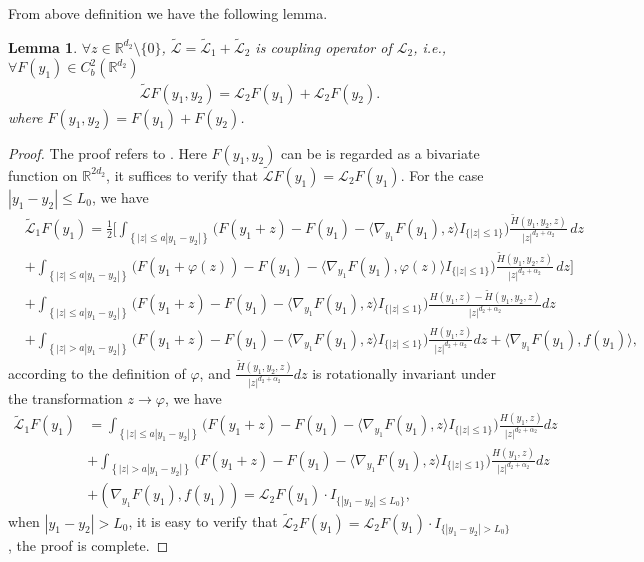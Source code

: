\documentclass[11pt,reqno]{amsart}
\newtheorem{lemma}{\indent Lemma}[section]
\numberwithin{equation}{section}
\newcommand{\R}{\mathbb{R}}
\begin{document}
From above definition we have the following lemma.
\begin{lemma}\label{cou-oper}
$\forall z\in \R^{d_2}\setminus \{0\}$,  $\widetilde{\mathcal{L}}=\widetilde{\mathcal{L}}_1+\widetilde{\mathcal{L}}_2$ is coupling operator of $\mathcal{L}_2$, i.e., $\forall F(y_1)\in C^2_b(\R^{d_2})$
\begin{align}\label{cou}
\widetilde{\mathcal{L}}F(y_1,y_2)=\mathcal{L}_2F(y_1)+\mathcal{L}_2F(y_2).
\end{align}
where $F(y_1,y_2)=F(y_1)+F(y_2)$.
\end{lemma}
\begin{proof}
	The proof refers to \cite[Lemma 2.2]{DW}. Here
$F(y_1,y_2)$ can be is regarded as a bivariate function on $\R^{2d_2}$, it suffices to verify that $\widetilde{\mathcal{L}}F(y_1)=\mathcal{L}_2F(y_1)$.
For the case $|y_1-y_2|\leq L_0$, we have 
\begin{align*}
	&\widetilde{\mathcal{L}}_1F(y_1)
	=\frac{1}{2}\bigg[\int_{\left\{|z|\le a|y_1-y_2| \right\}} \Big(F(y_1+z)-F(y_1)-\langle \nabla_{y_1}F(y_1),z\rangle I_{\{|z|\le1\}}\Big)\frac{\widetilde{H}(y_1,y_2,z)}{|z|^{d_2+\alpha_2}}\,dz\\
	&+\int_{\left\{|z|\le  a|y_1-y_2|\right\}}\!\! \Big(F(y_1+\varphi(z))-F(y_1)-\langle \nabla_{y_1}F(y_1), \varphi(z)\rangle  I_{\{|z|\le1\}}\Big)\frac{\widetilde{H}(y_1,y_2,z)}{|z|^{d_2+\alpha_2}}\,dz\bigg]\\
	&+\int_{\left\{|z|\le  a|y_1-y_2|\right\}}\Big(F(y_1+z)-F(y_1)-\langle \nabla_{y_1}F(y_1), z\rangle  I_{\{|z|\le1\}}\Big)\frac{H(y_1,z)-\widetilde{H}(y_1,y_2,z)}{|z|^{d_2+\alpha_2}}dz\\
	&+\int_{\left\{|z|> a|y_1-y_2|\right\}}\Big(F(y_1+z)-F(y_1)-\langle \nabla_{y_1}F(y_1), z\rangle I_{\{|z|\le1\}}\Big)\frac{H(y_1,z)}{|z|^{d_2+\alpha_2}}dz+\langle \nabla_{y_1}F(y_1),f(y_1)\rangle,
\end{align*}
according to the definition of $\varphi$, and $\frac{\widetilde{H}(y_1,y_2,z)}{|z|^{d_2+\alpha_2}}dz$ is  rotationally invariant under the transformation $z\rightarrow\varphi$,  we have 
\begin{align*}
\widetilde{\mathcal{L}}_1F(y_1)
&=\int_{\left\{|z|\le  a|y_1-y_2|\right\}}\Big(F(y_1+z)-F(y_1)-\langle \nabla_{y_1}F(y_1), z\rangle  I_{\{|z|\le1\}}\Big)\frac{H(y_1,z)}{|z|^{d_2+\alpha_2}}dz\\
&+\int_{\left\{|z|> a|y_1-y_2|\right\}}\Big(F(y_1+z)-F(y_1)-\langle \nabla_{y_1}F(y_1), z\rangle I_{\{|z|\le1\}}\Big)\frac{H(y_1,z)}{|z|^{d_2+\alpha_2}}dz\\
&+(\nabla_{y_1}F(y_1),f(y_1))=\mathcal{L}_2F(y_1)\cdot I_{\{|y_1-y_2|\leq L_0\}},
\end{align*}
when $|y_1-y_2|> L_0$, it is easy to verify that $\widetilde{\mathcal{L}}_2F(y_1)=\mathcal{L}_2F(y_1)\cdot I_{\{|y_1-y_2|> L_0\}}$, the proof is complete.
\end{proof}
\end{document}
